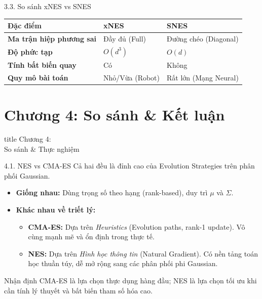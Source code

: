 \documentclass[10pt,xcolor=dvipsnames]{beamer}
\begin{document}
	\begin{frame}{3.3. So sánh xNES vs SNES}
		\centering
		\begin{table}
			\begin{tabular}{l p{3.5cm} p{3.5cm}}
				\toprule
				\textbf{Đặc điểm} & \textbf{xNES} & \textbf{SNES} \\
				\midrule
				\textbf{Ma trận hiệp phương sai} & Đầy đủ (Full) & Đường chéo (Diagonal) \\
				\textbf{Độ phức tạp} & $O(d^3)$ & $O(d)$ \\
				\textbf{Tính bất biến quay} & Có & Không \\
				\textbf{Quy mô bài toán} & Nhỏ/Vừa (Robot) & Rất lớn (Mạng Neural) \\
				\bottomrule
			\end{tabular}
		\end{table}
	\end{frame}
	
	\section{Chương 4: So sánh & Kết luận}
	
	\begin{frame}
		\centering
		\begin{beamercolorbox}[sep=16pt,center,shadow=true,rounded=true]{title}
			\huge Chương 4:\\[0.5em] So sánh \& Thực nghiệm \par
		\end{beamercolorbox}
	\end{frame}
	
	\begin{frame}{4.1. NES vs CMA-ES}
		Cả hai đều là đỉnh cao của Evolution Strategies trên phân phối Gaussian.
		\begin{itemize}
			\item \textbf{Giống nhau:} Dùng trọng số theo hạng (rank-based), duy trì $\mu$ và $\Sigma$.
			\item \textbf{Khác nhau về triết lý:}
			\begin{itemize}
				\item \textbf{CMA-ES:} Dựa trên \textit{Heuristics} (Evolution paths, rank-1 update). Vô cùng mạnh mẽ và ổn định trong thực tế.
				\item \textbf{NES:} Dựa trên \textit{Hình học thông tin} (Natural Gradient). Có nền tảng toán học thuần túy, dễ mở rộng sang các phân phối phi Gaussian.
			\end{itemize}
		\end{itemize}
		\begin{exampleblock}{Nhận định}
			CMA-ES là lựa chọn thực dụng hàng đầu; NES là lựa chọn tối ưu khi cần tính lý thuyết và bất biến tham số hóa cao.
		\end{exampleblock}
	\end{frame}
	
\end{document}
